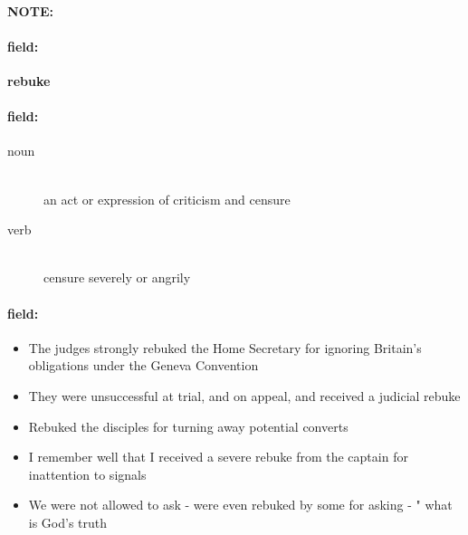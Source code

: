 \documentclass[12pt]{article}
\newenvironment{note}{\paragraph{NOTE:}}{}
\newenvironment{field}{\paragraph{field:}}{}
\begin{document}
\begin{note}
\begin{field}
\textbf{\large rebuke}
\end{field}


\begin{field}
\begin{description}
\item[noun] \hfill \\ 
an act or expression of criticism and censure

\item[verb] \hfill \\ 
censure severely or angrily

\end{description}
\end{field}

\begin{field}
\begin{itemize}
\item The judges strongly rebuked the Home Secretary for ignoring Britain's obligations under the Geneva Convention
\item They were unsuccessful at trial, and on appeal, and received a judicial rebuke
\item Rebuked the disciples for turning away potential converts
\item I remember well that I received a severe rebuke from the captain for inattention to signals
\item We were not allowed to ask - were even rebuked by some for asking - " what is God's truth
\end{itemize}
\end{field}
\end{note}
\end{document}
